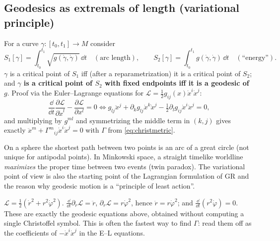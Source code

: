 \subsection{Geodesics as extremals of length (variational principle)}
\begin{formal}
For a curve $\gamma:[t_0,t_1]\to M$ consider
\[
S_1[\gamma]=\int_{t_0}^{t_1}\sqrt{g(\dot\gamma,\dot\gamma)}\,\dd t\quad(\text{arc length}),\qquad
S_2[\gamma]=\int_{t_0}^{t_1}g(\dot\gamma,\dot\gamma)\,\dd t\quad(\text{``energy''}).
\]
$\gamma$ is a critical point of $S_1$ iff (after a reparametrization) it is a critical point of $S_2$; and \textbf{$\gamma$ is a critical point of $S_2$ with fixed endpoints iff it is a geodesic of $g$}. Proof via the Euler--Lagrange equations for $\mathcal L=\tfrac12g_{ij}(x)\dot x^i\dot x^j$:
\[
\frac{\dd}{\dd t}\frac{\partial\mathcal L}{\partial\dot x^l}-\frac{\partial\mathcal L}{\partial x^l}=0\iff g_{lj}\ddot x^j+\partial_kg_{lj}\dot x^k\dot x^j-\tfrac12\partial_lg_{ij}\dot x^i\dot x^j=0,
\]
and multiplying by $g^{ml}$ and symmetrizing the middle term in $(k,j)$ gives exactly $\ddot x^m+\Gamma^m{}_{ij}\dot x^i\dot x^j=0$ with $\Gamma$ from \eqref{eq:christmetric}.
\end{formal}
\begin{intuition}
On a sphere the shortest path between two points is an arc of a great circle (not unique for antipodal points). In Minkowski space, a straight timelike worldline \emph{maximizes} the proper time between two events (twin paradox). The variational point of view is also the starting point of the Lagrangian formulation of GR and the reason why geodesic motion is a ``principle of least action''.
\end{intuition}

\begin{example}
$\mathcal L=\tfrac12(\dot r^2+r^2\dot\varphi^2)$. $\frac{\dd}{\dd t}\partial_{\dot r}\mathcal L=\ddot r$, $\partial_r\mathcal L=r\dot\varphi^2$, hence $\ddot r=r\dot\varphi^2$; and $\frac{\dd}{\dd t}(r^2\dot\varphi)=0$. These are exactly the geodesic equations above, obtained without computing a single Christoffel symbol. This is often the fastest way to find $\Gamma$: read them off as the coefficients of $-\dot x^i\dot x^j$ in the E--L equations.
\end{example}

